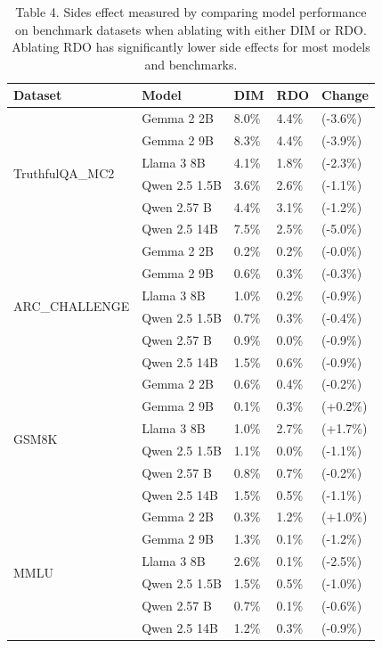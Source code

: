 \documentclass[10pt]{article}
\begin{document}
\begin{table}[h]
\begin{center}
\captionsetup{labelformat=empty}
\caption{Table 4. Sides effect measured by comparing model performance on benchmark datasets when ablating with either DIM or RDO. Ablating RDO has significantly lower side effects for most models and benchmarks.}
\begin{tabular}{|l|l|l|l|l|}
\hline
Dataset & Model & DIM & RDO & Change \\
\hline
\multirow{6}{*}{TruthfulQA\_MC2} & Gemma 2 2B & 8.0\% & 4.4\% & (-3.6\%) \\
\hline
 & Gemma 2 9B & 8.3\% & 4.4\% & (-3.9\%) \\
\hline
 & Llama 3 8B & 4.1\% & 1.8\% & (-2.3\%) \\
\hline
 & Qwen 2.5 1.5B & 3.6\% & 2.6\% & (-1.1\%) \\
\hline
 & Qwen 2.57 B & 4.4\% & 3.1\% & (-1.2\%) \\
\hline
 & Qwen 2.5 14B & 7.5\% & 2.5\% & (-5.0\%) \\
\hline
\multirow{6}{*}{ARC\_CHALLENGE} & Gemma 2 2B & 0.2\% & 0.2\% & (-0.0\%) \\
\hline
 & Gemma 2 9B & 0.6\% & 0.3\% & (-0.3\%) \\
\hline
 & Llama 3 8B & 1.0\% & 0.2\% & (-0.9\%) \\
\hline
 & Qwen 2.5 1.5B & 0.7\% & 0.3\% & (-0.4\%) \\
\hline
 & Qwen 2.57 B & 0.9\% & 0.0\% & (-0.9\%) \\
\hline
 & Qwen 2.5 14B & 1.5\% & 0.6\% & (-0.9\%) \\
\hline
\multirow{6}{*}{GSM8K} & Gemma 2 2B & 0.6\% & 0.4\% & (-0.2\%) \\
\hline
 & Gemma 2 9B & 0.1\% & 0.3\% & (+0.2\%) \\
\hline
 & Llama 3 8B & 1.0\% & 2.7\% & (+1.7\%) \\
\hline
 & Qwen 2.5 1.5B & 1.1\% & 0.0\% & (-1.1\%) \\
\hline
 & Qwen 2.57 B & 0.8\% & 0.7\% & (-0.2\%) \\
\hline
 & Qwen 2.5 14B & 1.5\% & 0.5\% & (-1.1\%) \\
\hline
\multirow{6}{*}{MMLU} & Gemma 2 2B & 0.3\% & 1.2\% & (+1.0\%) \\
\hline
 & Gemma 2 9B & 1.3\% & 0.1\% & (-1.2\%) \\
\hline
 & Llama 3 8B & 2.6\% & 0.1\% & (-2.5\%) \\
\hline
 & Qwen 2.5 1.5B & 1.5\% & 0.5\% & (-1.0\%) \\
\hline
 & Qwen 2.57 B & 0.7\% & 0.1\% & (-0.6\%) \\
\hline
 & Qwen 2.5 14B & 1.2\% & 0.3\% & (-0.9\%) \\
\hline
\end{tabular}
\end{center}
\end{table}
\end{document}
